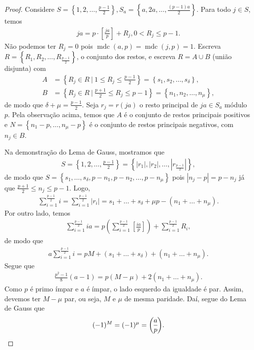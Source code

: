 \documentclass[a4paper,11pt,twoside, leqno]{article}
\DeclareMathOperator{\mdc}{mdc}
\newcommand{\genlegendre}[4]{%
	\genfrac{(}{)}{}{#1}{#3}{#4}%
	\if\relax\detokenize{#2}\relax\else_{\!#2}\fi
}
\newcommand{\legendre}[3][]{\genlegendre{}{#1}{#2}{#3}}
\theoremstyle{definition}
\begin{document}
\begin{proof}
	Considere $\displaystyle{ S = \left\{ 1,2,\dots, \frac{p-1}{2} \right\} , S_a = \left\{ a,2a,\dots, \frac{(p-1)a}{2} \right\}}$. Para todo $j\in S$, temos
	\begin{align*}
	ja = p\cdot\left[ \frac{ja}{p} \right] + R_j, 0 < R_j\leq p-1.
	\end{align*}
	Não podemos ter $R_j = 0$ pois $\mdc(a,p) = \mdc(j,p) = 1$. Escreva $R = \left\{ R_1,R_2,\dots,R_{\frac{p-1}{2}} \right\}$, o conjunto dos restos, e escreva $R = A\cup B$ (união disjunta) com
	\begin{align*}
	A &= \left\{ R_j\in R \ | \ 1\leq R_j\leq \frac{p-1}{2} \right\}  = \left\{ s_1,s_2,\dots, s_\delta \right\},\\
	B &= \left\{ R_j\in R \ | \ \frac{p+1}{2}\leq R_j\leq p-1 \right\} = \left\{ n_1,n_2,\dots, n_\mu \right\},
	\end{align*}
	de modo que $\displaystyle{ \delta + \mu = \frac{p-1}{2}}$. Seja $r_j = r(ja)$ o resto principal de $ja\in S_a$ módulo $p$. Pela observação acima, temos que $A$ é o conjunto de restos principais positivos e $N = \left\{ n_1 - p, \dots, n_\mu - p \right\}$ é o conjunto de restos principais negativos, com $n_j\in B$. 
	\par\vspace{0.3cm} Na demonstração do Lema de Gauss, mostramos que
	\begin{align*}
	S = \left\{ 1,2,\dots, \frac{p-1}{2} \right\} = \left\{ |r_1|, |r_2|, \dots, |r_{\frac{p-1}{2}}| \right\},
	\end{align*}
	de modo que $S = \left\{ s_1,\dots, s_\delta, p-n_1,p-n_2,\dots, p-n_\mu \right\}$ pois $|n_j - p| = p-n_j$ já que $\displaystyle{ \frac{p+1}{2}\leq n_j\leq p-1 }$. Logo,
	\begin{align*}
	\sum_{i=1}^{\frac{p-1}{2}}i = \sum_{i=1}^{\frac{p-1}{2}}|r_i| = s_1+\dots + s_\delta + \mu p - (n_1 + \dots + n_\mu).
	\end{align*}
	Por outro lado, temos
	\begin{align*}
	\sum_{i=1}^{\frac{p-1}{2}}ia = p\left( \sum_{i=1}^{\frac{p-1}{2}}\left[ \frac{ia}{p} \right] \right) + \sum_{i=1}^{\frac{p-1}{2}}R_i,
	\end{align*} 
	de modo que
	\begin{align*}
	a\sum_{i=1}^{\frac{p-1}{2}}i = pM + (s_1+\dots + s_\delta) + (n_1 + \dots + n_\mu).
	\end{align*}
	Segue que
	\begin{align*}
	\frac{p^2 - 1}{8}(a-1) = p(M - \mu) + 2(n_1 + \dots + n_\mu). 
	\end{align*}
	Como $p$ é primo ímpar e $a$ é ímpar, o lado esquerdo da igualdade é par. Assim, devemos ter $M - \mu$ par, ou seja, $M$ e $\mu$ de mesma paridade. Daí, segue do Lema de Gauss que
	\begin{align*}
	(-1)^M = (-1)^\mu = \legendre[]{a}{p}.
	\end{align*}
\end{proof}
\end{document}
